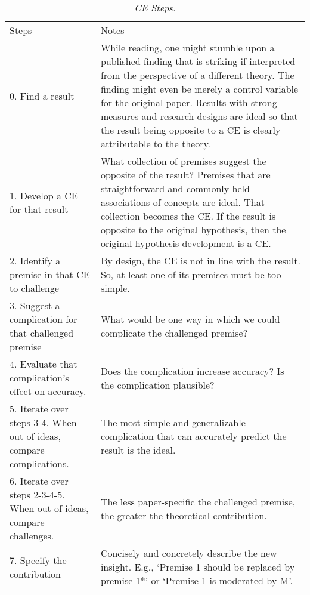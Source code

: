 \documentclass[empirical, authordate, meta]{jote-new-article}
\begin{document}
\begin{table}
\caption{\emph{CE Steps.}}
\label{tab:3}
  
\begin{fullwidth}
\begin{tabularx}{\columnwidth}{l  l}

  Steps & Notes\\
0. Find a result & While reading, one might stumble upon a published finding that is striking if interpreted from the perspective of a different theory. The finding might even be merely a control variable for the original paper. 
\newline Results with strong measures and research designs are ideal so that the result being opposite to a CE is clearly attributable to the theory. \\
1. Develop a CE for that result & What collection of premises suggest the opposite of the result? Premises that are  straightforward and commonly held  associations of concepts are ideal. That collection becomes the CE. If the result is opposite to the original hypothesis, then the original hypothesis development is a CE.\\
2. Identify a premise in that CE to challenge & By design, the CE is not in line with the result. So, at least one of its premises must be too simple. \\
3. Suggest a complication for that challenged premise & What would be one way in which we could complicate the challenged premise?\\
4. Evaluate that complication's effect on accuracy. & Does the complication increase accuracy? Is the complication plausible?\\
5. Iterate over steps 3-4. When out of ideas, compare complications. & The most  simple and generalizable  complication that can  accurately  predict the result is the ideal.\\
6. Iterate over steps 2-3-4-5. When out of ideas, compare challenges. & The  less paper-specific the challenged premise, the greater the theoretical contribution.\\
7. Specify the contribution & Concisely and concretely describe the new insight.  \newline E.g., ‘Premise 1 should be replaced by premise 1*' or ‘Premise 1 is moderated by M'.\\


\end{tabularx}
\end{fullwidth}


\end{table}
\end{document}

